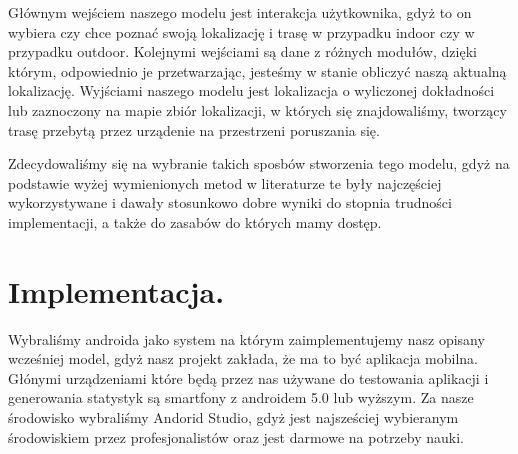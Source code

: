 \documentclass[11pt]{article}
\begin{document}
		 Głównym wejściem naszego modelu jest interakcja użytkownika, gdyż to on wybiera czy chce poznać swoją lokalizację i trasę w przypadku indoor czy w przypadku outdoor. Kolejnymi wejściami są dane z różnych modułów, dzięki którym, odpowiednio je przetwarzając, jesteśmy w stanie obliczyć naszą aktualną lokalizację. Wyjściami naszego modelu jest lokalizacja o wyliczonej dokładności lub zaznoczony na mapie zbiór lokalizacji, w których się znajdowaliśmy, tworzący  trasę przebytą przez urządenie na przestrzeni poruszania się.
		 
		 Zdecydowaliśmy się na wybranie takich sposbów stworzenia tego modelu, gdyż na podstawie wyżej wymienionych metod w literaturze te były najczęściej wykorzystywane i dawały stosunkowo dobre wyniki do stopnia trudności implementacji, a także do zasabów do których mamy dostęp.
		 
	\section{Implementacja.}
	
		Wybraliśmy androida jako system na którym zaimplementujemy nasz opisany wcześniej model, gdyż nasz projekt zakłada, że ma to być aplikacja mobilna. Głónymi urządzeniami które będą przez nas używane do testowania aplikacji i generowania statystyk są smartfony z androidem 5.0 lub wyższym. Za nasze środowisko wybraliśmy Andorid Studio, gdyż jest najsześciej wybieranym środowiskiem przez profesjonalistów oraz jest darmowe na potrzeby nauki. 
\end{document}
